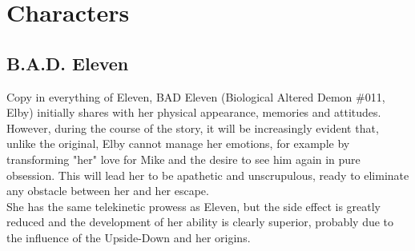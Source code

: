\section{Characters}

\subsection{B.A.D. Eleven}
Copy in everything of Eleven, BAD Eleven (Biological Altered Demon \#011, Elby) initially shares with her physical appearance, memories and attitudes.
However, during the course of the story, it will be increasingly evident that, unlike the original, Elby cannot manage her emotions, for example by transforming "her" love for Mike and the desire to see him again in pure obsession. This will lead her to be apathetic and unscrupulous, ready to eliminate any obstacle between her and her escape.\\
She has the same telekinetic prowess as Eleven, but the side effect is greatly reduced and the development of her ability is clearly superior, probably due to the influence of the Upside-Down and her origins.

